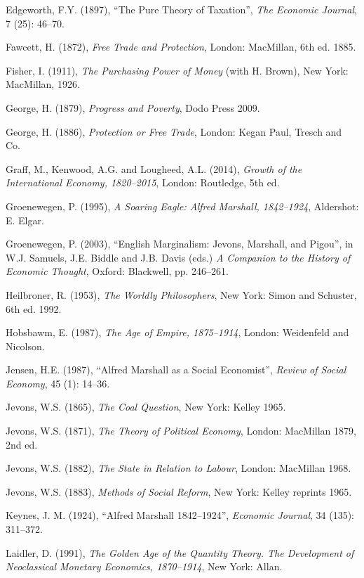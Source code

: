 \documentclass[12pt]{article}
\begin{document}
\begin{description}
    \item Edgeworth, F.Y. (1897), “The Pure Theory of Taxation”, \textit{The Economic Journal}, 7 (25): 46–70.
    \item Fawcett, H. (1872), \textit{Free Trade and Protection}, London: MacMillan, 6th ed. 1885.
    \item Fisher, I. (1911), \textit{The Purchasing Power of Money} (with H. Brown), New York: MacMillan, 1926.
    \item George, H. (1879), \textit{Progress and Poverty}, Dodo Press 2009.
    \item George, H. (1886), \textit{Protection or Free Trade}, London: Kegan Paul, Tresch and Co.
    \item Graff, M., Kenwood, A.G. and Lougheed, A.L. (2014), \textit{Growth of the International Economy, 1820–2015}, London: Routledge, 5th ed.
    \item Groenewegen, P. (1995), \textit{A Soaring Eagle: Alfred Marshall, 1842–1924}, Aldershot: E. Elgar.
    \item Groenewegen, P. (2003), “English Marginalism: Jevons, Marshall, and Pigou”, in W.J. Samuels, J.E. Biddle and J.B. Davis (eds.) \textit{A Companion to the History of Economic Thought}, Oxford: Blackwell, pp. 246–261.
    \item Heilbroner, R. (1953), \textit{The Worldly Philosophers}, New York: Simon and Schuster, 6th ed. 1992.
    \item Hobsbawm, E. (1987), \textit{The Age of Empire, 1875–1914}, London: Weidenfeld and Nicolson.
    \item Jensen, H.E. (1987), “Alfred Marshall as a Social Economist”, \textit{Review of Social Economy}, 45 (1): 14–36.
    \item Jevons, W.S. (1865), \textit{The Coal Question}, New York: Kelley 1965.
    \item Jevons, W.S. (1871), \textit{The Theory of Political Economy}, London: MacMillan 1879, 2nd ed.
    \item Jevons, W.S. (1882), \textit{The State in Relation to Labour}, London: MacMillan 1968.
    \item Jevons, W.S. (1883), \textit{Methods of Social Reform}, New York: Kelley reprints 1965.
    \item Keynes, J. M. (1924), “Alfred Marshall 1842–1924”, \textit{Economic Journal}, 34 (135): 311–372.
    \item Laidler, D. (1991), \textit{The Golden Age of the Quantity Theory. The Development of Neoclassical Monetary Economics, 1870–1914}, New York: Allan.

\end{description}
\end{document}
